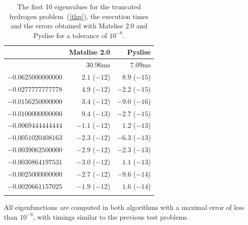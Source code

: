 \begin{table}
  \begin{center}
    \begin{tabular}[]{rrr}
      \toprule
                         & Matslise 2.0     & Pyslise         \\
      \midrule
                         & $30.96\text{ms}$ & $7.09\text{ms}$ \\
      $-0.0625000000000$ & $2.1$ ($-12$)    & $8.9$ ($-15$)   \\
      $-0.0277777777778$ & $4.9$ ($-12$)    & $-2.2$ ($-15$)  \\
      $-0.0156250000000$ & $3.4$ ($-12$)    & $-9.0$ ($-16$)  \\
      $-0.0100000000000$ & $9.4$ ($-13$)    & $-2.7$ ($-15$)  \\
      $-0.0069444444444$ & $-1.1$ ($-12$)   & $1.2$ ($-13$)   \\
      $-0.0051020408163$ & $-2.3$ ($-12$)   & $-6.3$ ($-13$)  \\
      $-0.0039062500000$ & $-2.9$ ($-12$)   & $-2.3$ ($-13$)  \\
      $-0.0030864197531$ & $-3.0$ ($-12$)   & $1.1$ ($-13$)   \\
      $-0.0025000000000$ & $-2.7$ ($-12$)   & $-9.6$ ($-14$)  \\
      $-0.0020661157025$ & $-1.9$ ($-12$)   & $1.6$ ($-14$)   \\
                         &                  &                 \\
      \bottomrule
    \end{tabular}
    \caption{\label{tab:c2_tab7}The first 10 eigenvalues for the truncated hydrogen problem~(\ref{thp}),
      the execution times and the errors obtained with Matslise 2.0 and Pyslise for a tolerance of $10^{-8}$.  }
  \end{center}
\end{table}

All eigenfunctions are computed in both algorithms with a maximal error of less than $10^{-9}$, with timings similar to the previous test problems.

\stopchapter
